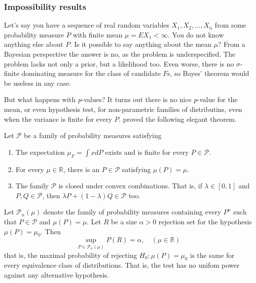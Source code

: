 \subsubsection{Impossibility results}

Let's say you have a sequence of real random variables $X_{1},X_{2},\ldots,X_{n}$
from some probability measure $P$ with finite mean $\mu=EX_{1}<\infty$.
You do not know anything else about $P$. Is it possible to say anything
about the mean $\mu$? From a Bayesian perspective the answer is no,
as the problem is underspecified. The problem lacks not only a prior,
but a likelihood too. Even worse, there is no $\sigma$-finite dominating
measure for the class of candidate $F$s, so Bayes' theorem would
be useless in any case. 

But what happens with \emph{p}-values? It turns out there is no nice
\emph{p}-value for the mean, or even hypothesis test, for non-parametric
families of distributins, even when the variance is finite for every
$P$. \cite{Bahadur1956-tg} proved the following elegant theorem.
\begin{theorem}
Let $\mathcal{\mathcal{P}}$ be a family of probability measures
satisfying
\begin{enumerate}
\item The expectation $\mu_{F}=\int xdP$ exists and is finite for every
$P\in\mathcal{P}$.
\item For every $\mu\in\mathbb{R}$, there is an $P\in\mathcal{\mathcal{P}}$
satisfying $\mu(P)=\mu$.
\item The family $\mathcal{\mathcal{P}}$ is closed under convex combinations.
That is, if $\lambda\in[0,1]$ and $P,Q\in\mathcal{P}$, then $\lambda P+(1-\lambda)Q\in\mathcal{P}$
too.
\end{enumerate}
Let $\mathcal{P}_{n}(\mu)$ denote the family of probability measures
containing every $P^{n}$ such that $P\in\mathcal{P}$ and $\mu(P)=\mu$.
Let $R$ be a size $\alpha>0$ rejection set for the hypothesis $\mu(P)=\mu_{0}$.
Then 
\[
\sup_{P\in\mathcal{P}_{n}(\mu)}P(R)=\alpha,\quad(\mu\in\mathbb{R})
\]
that is, the maximal probability of rejecting $H_{0}:\mu(P)=\mu_{0}$
is the same for every equivalence class of distributions. That is,
the test has no unifom power against any alternative hypothesis. 
\end{theorem}

